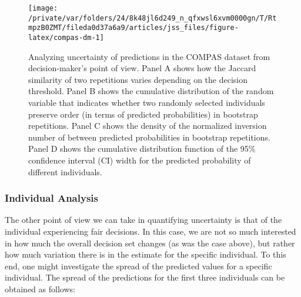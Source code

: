 \documentclass[
  nojss]{jss}
\begin{document}
\begin{CodeChunk}
\begin{figure}

{\centering \texttt{[image: /private/var/folders/24/8k48jl6d249\_n\_qfxwsl6xvm0000gn/T/RtmpzB0ZMT/fileda0d37a6a9/articles/jss\_files/figure-latex/compas-dm-1]} 

}

\caption[Analyzing uncertainty of predictions in the COMPAS dataset from decision-maker's point of view]{Analyzing uncertainty of predictions in the COMPAS dataset from decision-maker's point of view. Panel A shows how the Jaccard similarity of two repetitions varies depending on the decision threshold. Panel B shows the cumulative distribution of the random variable that indicates whether two randomly selected individuals preserve order (in terms of predicted probabilities) in bootstrap repetitions. Panel C shows the density of the normalized inversion number of between predicted probabilities in bootstrap repetitions. Panel D shows the cumulative distribution function of the 95\% confidence interval (CI) width for the predicted probability of different individuals.}\label{fig:compas-dm}
\end{figure}
\end{CodeChunk}

\hypertarget{individual-analysis}{%
\subsubsection{Individual Analysis}\label{individual-analysis}}

The other point of view we can take in quantifying uncertainty is that
of the individual experiencing fair decisions. In this case, we are not
so much interested in how much the overall decision set changes (as was
the case above), but rather how much variation there is in the estimate
for the specific individual. To this end, one might investigate the
spread of the predicted values for a specific individual. The spread of
the predictions for the first three individuals can be obtained as
follows:

\begin{CodeChunk}
\end{CodeChunk}
\end{document}
